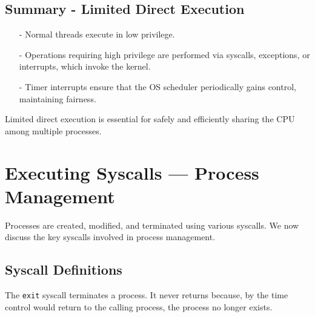 \documentclass[../../compsys.tex]{subfiles}
\begin{document}
\subsection*{Summary - Limited Direct Execution}
\begin{itemize}
  \item[-] Normal threads execute in low privilege.
  \item[-] Operations requiring high privilege are performed via syscalls, exceptions, or interrupts, which invoke the kernel.
  \item[-] Timer interrupts ensure that the OS scheduler periodically gains control, maintaining fairness.
\end{itemize}

Limited direct execution is essential for safely and efficiently sharing the CPU among multiple processes.

\section{Executing Syscalls --- Process Management}

Processes are created, modified, and terminated using various syscalls. We now discuss the key syscalls involved in process management.

\subsection{Syscall Definitions}

\begin{definition}
The \texttt{exit} syscall terminates a process. It never returns because, by the time control would return to the calling process, the process no longer exists.
\end{definition}
\end{document}
